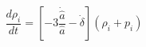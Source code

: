 \begin{equation}\label{flueq}
\frac{d \rho_i}{d
t}=\left[-3\frac{\dot{\hat{a}}}{\hat{a}}-\dot{\delta}\right](\rho_i+p_i)
\end{equation}

